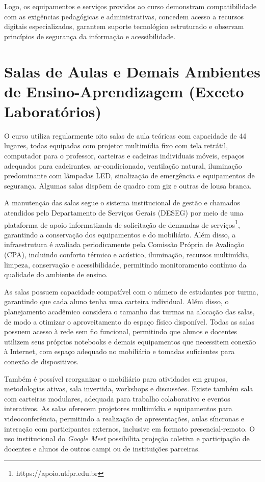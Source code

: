 Logo, os equipamentos e serviços providos ao curso demonstram compatibilidade com as exigências pedagógicas e administrativas, concedem acesso a recursos digitais especializados, garantem suporte tecnológico estruturado e observam princípios de segurança da informação e acessibilidade.

\section{Salas de Aulas e Demais Ambientes de Ensino-Aprendizagem (Exceto Laboratórios)}

O curso utiliza regularmente oito salas de aula teóricas com capacidade de 44 lugares, todas equipadas com projetor multimídia fixo com tela retrátil, computador para o professor, carteiras e cadeiras individuais móveis, espaços adequados para cadeirantes, ar-condicionado, ventilação natural, iluminação predominante com lâmpadas LED, sinalização de emergência e equipamentos de segurança. Algumas salas dispõem de quadro com giz e outras de lousa branca.

A manutenção das salas segue o sistema institucional de gestão e chamados atendidos pelo Departamento de Serviços Gerais (DESEG) por meio de uma plataforma de apoio informatizada de solicitação de demandas de serviços\footnote{https://apoio.utfpr.edu.br}, garantindo a conservação dos equipamentos e do mobiliário. Além disso, a infraestrutura é avaliada periodicamente pela Comissão Própria de Avaliação (CPA), incluindo conforto térmico e acústico, iluminação, recursos multimídia, limpeza, conservação e acessibilidade, permitindo monitoramento contínuo da qualidade do ambiente de ensino.

As salas possuem capacidade compatível com o número de estudantes por turma, garantindo que cada aluno tenha uma carteira individual. Além disso, o planejamento acadêmico considera o tamanho das turmas na alocação das salas, de modo a otimizar o aproveitamento do espaço físico disponível. Todas as salas possuem acesso à rede sem fio funcional, permitindo que alunos e docentes utilizem seus próprios notebooks e demais equipamentos que necessitem conexão à Internet, com espaço adequado no mobiliário e tomadas suficientes para conexão de dispositivos.

Também é possível reorganizar o mobiliário para atividades em grupos, metodologias ativas, sala invertida, workshops e discussões. Existe também sala com carteiras modulares, adequada para trabalho colaborativo e eventos interativos. As salas oferecem projetores multimídia e equipamentos para videoconferência, permitindo a realização de apresentações, aulas síncronas e interação com participantes externos, inclusive em formato presencial-remoto. O uso institucional do \textit{Google Meet} possibilita projeção coletiva e participação de docentes e alunos de outros campi ou de instituições parceiras.

